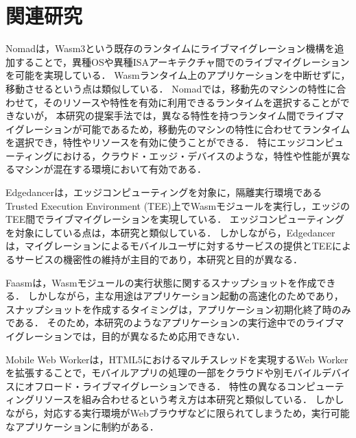 \chapter{関連研究}
Nomad\cite{nurul2021nomad}は，Wasm3という既存のランタイムにライブマイグレーション機構を追加することで，異種OSや異種ISAアーキテクチャ間でのライブマイグレーションを可能を実現している．
Wasmランタイム上のアプリケーションを中断せずに，移動させるという点は類似している．
Nomadでは，移動先のマシンの特性に合わせて，そのリソースや特性を有効に利用できるランタイムを選択することができないが，
本研究の提案手法では，異なる特性を持つランタイム間でライブマイグレーションが可能であるため，移動先のマシンの特性に合わせてランタイムを選択でき，特性やリソースを有効に使うことができる．
特にエッジコンピューティングにおける，クラウド・エッジ・デバイスのような，特性や性能が異なるマシンが混在する環境において有効である．

Edgedancer\cite{edgedancer}は，エッジコンピューティングを対象に，隔離実行環境であるTrusted Execution Environment (TEE)上でWasmモジュールを実行し，エッジのTEE間でライブマイグレーションを実現している．
エッジコンピューティングを対象にしている点は，本研究と類似している．
しかしながら，Edgedancerは，マイグレーションによるモバイルユーザに対するサービスの提供とTEEによるサービスの機密性の維持が主目的であり，本研究と目的が異なる．

Faasm\cite{faasm}は，Wasmモジュールの実行状態に関するスナップショットを作成できる．
しかしながら，主な用途はアプリケーション起動の高速化のためであり，スナップショットを作成するタイミングは，アプリケーション初期化終了時のみである．
そのため，本研究のようなアプリケーションの実行途中でのライブマイグレーションでは，目的が異なるため応用できない．

Mobile Web Worker\cite{html-worker-migration}は，HTML5におけるマルチスレッドを実現するWeb Workerを拡張することで，モバイルアプリの処理の一部をクラウドや別モバイルデバイスにオフロード・ライブマイグレーションできる．
特性の異なるコンピューティングリソースを組み合わせるという考え方は本研究と類似している．
しかしながら，対応する実行環境がWebブラウザなどに限られてしまうため，実行可能なアプリケーションに制約がある．